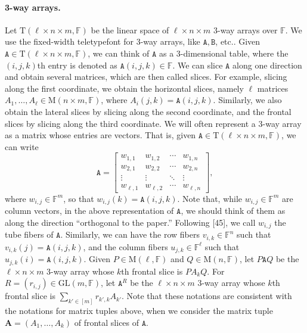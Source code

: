 \paragraph{3-way arrays.} Let $\mathrm T(\ell\times n\times m,\mathbb F)$ be the linear space of $\ell\times n\times m$ 3-way arrays over $\mathbb F$. We use the fixed-width teletypefont for 3-way arrays, like $\mathtt A,\mathtt B$, etc..
Given $\mathtt A\in\mathrm T(\ell\times n\times m,\mathbb F)$, we can think of $\mathtt A$ as a 3-dimensional table, where the $(i,j,k)$th entry is denoted as $\mathtt A(i,j,k)\in\mathbb F$. We can slice $\mathtt A$ along one direction and obtain several matrices, which are then called slices. For example, slicing along the first coordinate, we obtain the horizontal slices, namely $\ell$ matrices $A_1,\ldots,A_\ell\in\mathrm M(n\times m,\mathbb F)$, where $A_i(j,k)=\mathtt A(i,j,k)$. Similarly, we also obtain the lateral slices by slicing along the second coordinate, and the frontal slices by slicing along the third coordinate.
We will often represent a 3-way array as a matrix whose entries are vectors. That is, given $\mathtt A\in\mathrm T(\ell\times n\times m,\mathbb F)$, we can write
\[\mathtt A=\begin{bmatrix}w_{1,1}&w_{1,2}&\cdots&w_{1,n}\\w_{2,1}&w_{2,2}&\cdots&w_{2,n}\\\vdots&\vdots&\ddots&\vdots\\w_{\ell,1}&w_{\ell,2}&\cdots&w_{\ell,n}\end{bmatrix},\]
where $w_{i,j}\in\mathbb F^m$, so that $w_{i,j}(k)=\mathtt A(i,j,k)$. Note that, while $w_{i,j}\in\mathbb F^m$ are column vectors, in the above representation of $\mathtt A$, we should think of them as along the direction ``orthogonal to the paper.'' Following [45], we call $w_{i,j}$ the tube fibers of $\mathtt A$. Similarly, we can have the row fibers $v_{i,k}\in\mathbb F^n$ such that $v_{i,k}(j)=\mathtt A(i,j,k)$, and the column fibers $u_{j,k}\in\mathbb F^\ell$ such that $u_{j,k}(i)=\mathtt A(i,j,k)$.
Given $P\in\mathrm M(\ell,\mathbb F)$ and $Q\in\mathrm M(n,\mathbb F)$, let $P\mathtt A Q$ be the $\ell\times n\times m$ 3-way array whose $k$th frontal slice is $PA_kQ$. For $R=(r_{i,j})\in\mathrm{GL}(m,\mathbb F)$, let $\mathtt A^R$ be the $\ell\times n\times m$ 3-way array whose $k$th frontal slice is $\sum_{k'\in[m]}r_{k',k}A_{k'}$. Note that these notations are consistent with the notations for matrix tuples above, when we consider the matrix tuple $\mathbf A=(A_1,\ldots,A_k)$ of frontal slices of $\mathtt A$.
